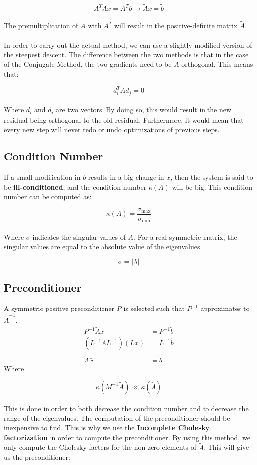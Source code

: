 \documentclass{article}
\begin{document}
\[ A^TAx = A^Tb \rightarrow \tilde{A}x = \tilde{b} \] \\
The premultiplication of $A$ with $A^T$ will result in the positive-definite matrix $\tilde{A}$. \\ \\
In order to carry out the actual method, we can use a slightly modified version of the steepest descent. The difference between the two methods is that in the case of the Conjugate Method, the two gradients need to be $A$-orthogonal. This means that:

\[ d^T_i A d_j = 0 \] \\
Where $d_i$ and $d_j$ are two vectors. By doing so, this would result in the new residual being orthogonal to the old residual. Furthermore, it would mean that every new step will never redo or undo optimizations of previous steps.

\subsection{Condition Number}
If a small modification in $b$ results in a big change in $x$, then the system is said to be \textbf{ill-conditioned}, and the condition number $\kappa(A)$ will be big. This condition number can be computed as:

\[ \kappa(A) = \frac{\sigma_{\max}}{\sigma_{\min}} \] \\
Where $\sigma$ indicates the singular values of $A$. For a real symmetric matrix, the singular values are equal to the absolute value of the eigenvalues.

\[ \sigma = |\lambda| \]

\subsection{Preconditioner}
A symmetric positive preconditioner $P$ is selected such that $P^{-1}$ approximates to $\tilde{A}^{-1}$.
\begin{align*}
	P^{-1}\tilde{A}x & = P^{-1}\tilde{b} \\
	(L^{-1}\tilde{A}L^{-1})(Lx) & = L^{-1}\tilde{b} \\
	\bar{\tilde{A}}\bar{x} & = \bar{\tilde{b}}
\end{align*}
Where

\[ \kappa(M^{-1}\tilde{A}) \ll \kappa(\tilde{A}) \]\\
This is done in order to both decrease the condition number and to decrease the range of the eigenvalues.
The computation of the preconditioner should be inexpensive to find. This is why we use the \textbf{Incomplete Cholesky factorization} in order to compute the preconditioner. By using this method, we only compute the Cholesky factors for the non-zero elements of $\tilde{A}$. This will give us the preconditioner:
\end{document}
